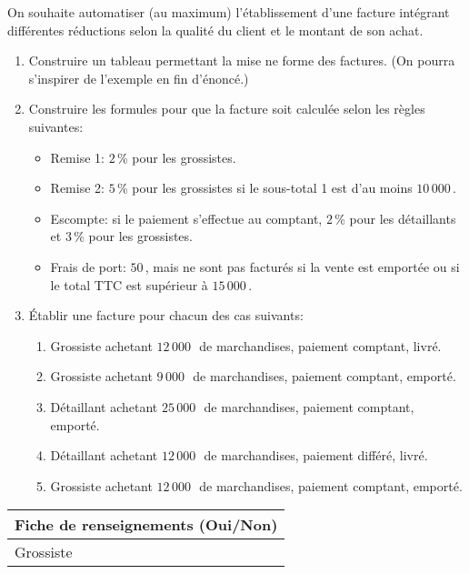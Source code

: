 \documentclass[a4paper, twoside, 11pt]{article}
\begin{document}
\begin{exercise}[Application]
  On souhaite automatiser (au maximum) l'établissement d'une facture intégrant différentes réductions selon la qualité du client et le montant de son achat.
  \begin{enumerate}
    \item Construire un tableau permettant la mise ne forme des factures. (On pourra s'inspirer de l'exemple en fin d'énoncé.)
    \item Construire les formules pour que la facture soit calculée selon les règles suivantes:
    \begin{itemize}
      \item Remise 1: $2$\,\% pour les grossistes.
      \item Remise 2: $5$\,\% pour les grossistes si le sous-total 1 est d'au moins $10\,000$\,\geneuro.
      \item Escompte: si le paiement s'effectue au comptant, $2$\,\% pour les détaillants et $3$\,\% pour les grossistes.
      \item Frais de port: $50$\,\geneuro, mais ne sont pas facturés si la vente est emportée ou si le total TTC est supérieur à $15\,000$\,\geneuro.
    \end{itemize}
    \item Établir une facture pour chacun des cas suivants:
    \begin{enumerate}
      \item Grossiste achetant $12\,000$\,\geneuro\ de marchandises, paiement comptant, livré.
      \item Grossiste achetant $9\,000$\,\geneuro\ de marchandises, paiement comptant, emporté.
      \item Détaillant achetant $25\,000$\,\geneuro\ de marchandises, paiement comptant, emporté.
      \item Détaillant achetant $12\,000$\,\geneuro\ de marchandises, paiement différé, livré.
      \item Grossiste achetant $12\,000$\,\geneuro\ de marchandises, paiement comptant, emporté.
    \end{enumerate}
  \end{enumerate}
  \begin{center} \fns
    \begin{tabularx}{0.5\linewidth}{|l|X|}
      \hline
      \multicolumn{2}{|c|}{\bfseries Fiche de renseignements (Oui/Non)} \\
      \hline\hline
      Grossiste         & \\

\end{tabularx}
\end{center}
\end{exercise}
\end{document}
